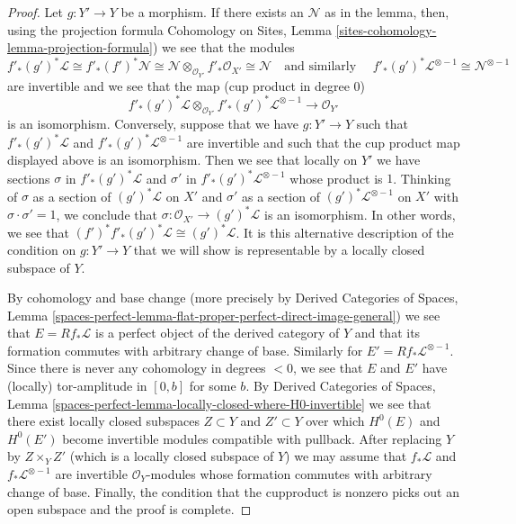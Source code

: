 \begin{proof}
Let $g : Y' \to Y$ be a morphism. If there exists an $\mathcal{N}$
as in the lemma, then, using the projection formula
Cohomology on Sites, Lemma \ref{sites-cohomology-lemma-projection-formula})
we see that the modules
$$
f'_*(g')^*\mathcal{L} \cong
f'_*(f')^*\mathcal{N} \cong
\mathcal{N} \otimes_{\mathcal{O}_{Y'}} f'_*\mathcal{O}_{X'} \cong
\mathcal{N}\quad\text{and similarly }\quad
f'_*(g')^*\mathcal{L}^{\otimes -1} \cong \mathcal{N}^{\otimes -1}
$$
are invertible and we see that the map (cup product in degree $0$)
$$
f'_*(g')^*\mathcal{L}
\otimes_{\mathcal{O}_{Y'}}
f'_*(g')^*\mathcal{L}^{\otimes -1}
\longrightarrow \mathcal{O}_{Y'}
$$
is an isomorphism. Conversely, suppose that we have $g : Y' \to Y$
such that $f'_*(g')^*\mathcal{L}$ and $f'_*(g')^*\mathcal{L}^{\otimes -1}$
are invertible and such that the cup product map displayed above is
an isomorphism. Then we see that locally on $Y'$ we have sections
$\sigma$ in $f'_*(g')^*\mathcal{L}$ and $\sigma'$ in
$f'_*(g')^*\mathcal{L}^{\otimes -1}$ whose product is $1$.
Thinking of $\sigma$ as a section of $(g')^*\mathcal{L}$ on $X'$
and $\sigma'$ as a section of $(g')^*\mathcal{L}^{\otimes -1}$ on $X'$
with $\sigma \cdot \sigma' = 1$, we conclude that
$\sigma : \mathcal{O}_{X'} \to (g')^*\mathcal{L}$ is an isomorphism.
In other words, we see that
$(f')^*f'_*(g')^*\mathcal{L} \cong (g')^*\mathcal{L}$.
It is this alternative description of the condition on
$g : Y' \to Y$ that we will show is representable by a
locally closed subspace of $Y$.

\medskip\noindent
By cohomology and base change (more precisely by
Derived Categories of Spaces, Lemma
\ref{spaces-perfect-lemma-flat-proper-perfect-direct-image-general})
we see that $E = Rf_*\mathcal{L}$ is a perfect object of the
derived category of $Y$ and that its formation commutes with
arbitrary change of base. Similarly for $E' = Rf_*\mathcal{L}^{\otimes -1}$.
Since there is never any cohomology in degrees $< 0$, we see that
$E$ and $E'$ have (locally) tor-amplitude in $[0, b]$ for some $b$.
By Derived Categories of Spaces, Lemma
\ref{spaces-perfect-lemma-locally-closed-where-H0-invertible}
we see that there exist locally closed subspaces
$Z \subset Y$ and $Z' \subset Y$ over which $H^0(E)$
and $H^0(E')$ become invertible modules compatible with pullback.
After replacing $Y$ by $Z \times_Y Z'$ (which is a locally closed
subspace of $Y$) we may assume that $f_*\mathcal{L}$ and
$f_*\mathcal{L}^{\otimes -1}$ are invertible $\mathcal{O}_Y$-modules
whose formation commutes with arbitrary change of base.
Finally, the condition that the cupproduct is nonzero picks
out an open subspace and the proof is complete.
\end{proof}





















